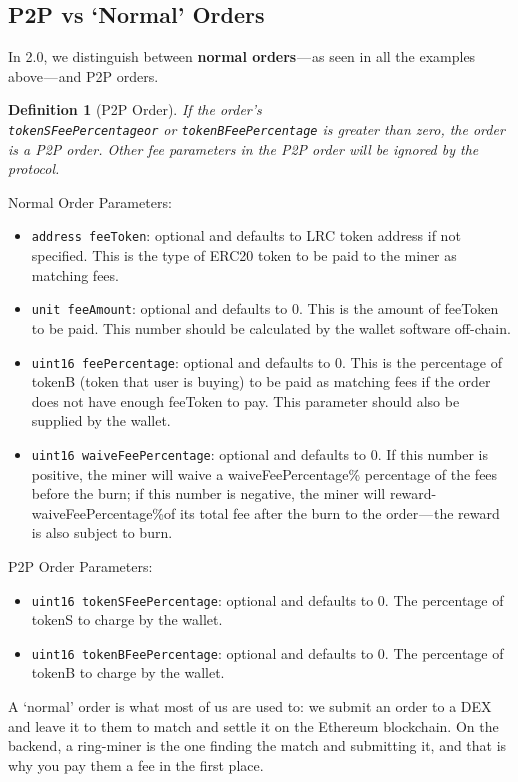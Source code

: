 \documentclass[UTF8,nofonts]{article}
\newtheorem{definition}{Definition}[section]
\begin{document}
\begin{multicols}{2}
\begin{appendices}
\subsection{P2P vs ‘Normal’ Orders}
In 2.0, we distinguish between \textbf{normal orders} — as seen in all the examples above — and P2P orders. 


\begin{definition}[P2P Order]If the order’s \\ \verb|tokenSFeePercentageor| or \verb|tokenBFeePercentage| is greater than zero, the order is a P2P order. Other fee parameters in the P2P order will be ignored by the protocol.
\end{definition}



Normal Order Parameters:

\begin{itemize}
	\item \verb|address feeToken|: optional and defaults to LRC token address if not specified. This is the type of ERC20 token to be paid to the miner as matching fees.
	\item \verb|unit feeAmount|: optional and defaults to 0. This is the amount of feeToken to be paid. This number should be calculated by the wallet software off-chain.
	\item \verb|uint16 feePercentage|: optional and defaults to 0. This is the percentage of tokenB (token that user is buying) to be paid as matching fees if the order does not have enough feeToken to pay. This parameter should also be supplied by the wallet.
	\item \verb|uint16 waiveFeePercentage|: optional and defaults to 0. If this number is positive, the miner will waive a waiveFeePercentage\% percentage of the fees before the burn; if this number is negative, the miner will reward-waiveFeePercentage\%of its total fee after the burn to the order — the reward is also subject to burn.
\end{itemize}

P2P Order Parameters:
\begin{itemize}
	\item \verb|uint16 tokenSFeePercentage|: optional and defaults to 0. The percentage of tokenS to charge by the wallet.
	\item \verb|uint16 tokenBFeePercentage|: optional and defaults to 0. The percentage of tokenB to charge by the wallet.
\end{itemize}

A ‘normal’ order is what most of us are used to: we submit an order to a DEX and leave it to them to match and settle it on the Ethereum blockchain. On the backend, a ring-miner is the one finding the match and submitting it, and that is why you pay them a fee in the first place.


\end{appendices}
\end{multicols}
\end{document}
